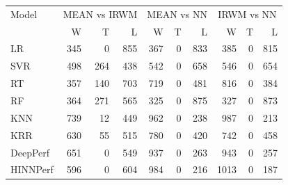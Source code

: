 \begin{tabular}{lrrrrrrrrr}
\toprule
Model & \multicolumn{3}{c}{MEAN vs IRWM} & \multicolumn{3}{c}{MEAN vs NN} & \multicolumn{3}{c}{IRWM vs NN} \\
& W & T & L & W & T & L & W & T & L \\
\midrule
LR & 345 & 0 & 855 & 367 & 0 & 833 & 385 & 0 & 815 \\
SVR & 498 & 264 & 438 & 542 & 0 & 658 & 546 & 0 & 654 \\
RT & 357 & 140 & 703 & 719 & 0 & 481 & 816 & 0 & 384 \\
RF & 364 & 271 & 565 & 325 & 0 & 875 & 327 & 0 & 873 \\
KNN & 739 & 12 & 449 & 962 & 0 & 238 & 987 & 0 & 213 \\
KRR & 630 & 55 & 515 & 780 & 0 & 420 & 742 & 0 & 458 \\
DeepPerf & 651 & 0 & 549 & 937 & 0 & 263 & 943 & 0 & 257 \\
HINNPerf & 596 & 0 & 604 & 984 & 0 & 216 & 1013 & 0 & 187 \\
\bottomrule
\end{tabular}
